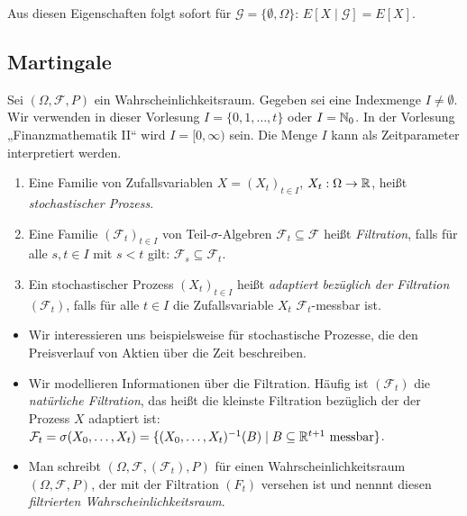 \documentclass[a4paper,twoside,DIV15,BCOR12mm]{scrbook}
\newcommand{\cF}{\mathcal F}
\begin{document}
Aus diesen Eigenschaften folgt sofort für $\mathcal G = \{\emptyset, \Omega\}$: $E[X\mid\mathcal G] = E[X]$.


\subsection{Martingale}

Sei $(\Omega, \cF, P)$ ein Wahrscheinlichkeitsraum. Gegeben sei eine Indexmenge $I\ne \emptyset$. Wir verwenden in dieser Vorlesung $I=\{0, 1,\ldots,t\}$ oder $I=\mathbb{N}_0$. In der Vorlesung „Finanzmathematik II“ wird $I=[0,\infty)$ sein. Die Menge $I$ kann als Zeitparameter interpretiert werden.

\begin{definition}
\begin{enumerate}
\item Eine Familie von Zufallsvariablen $X=(X_t)_{t\in I}$, $X_t:\Omega \to \mathbb{R}$, heißt \emph{stochastischer Prozess}.
\item Eine Familie $(\cF_t)_{t\in I}$ von Teil-$\sigma$-Algebren $\cF_t \subseteq \cF$ heißt \emph{Filtration}, falls für alle $s,t\in I$ mit $s<t$ gilt: $\cF_s \subseteq \cF_t$.
\item Ein stochastischer Prozess $(X_t)_{t\in I}$ heißt \emph{adaptiert bezüglich der Filtration $(\cF_t)$},  falls für alle $t\in I$ die Zufallsvariable $X_t$ $\cF_t$-messbar ist.
\end{enumerate}
\end{definition}

\begin{bemerkung}
\begin{itemize}
\item Wir interessieren uns beispielsweise für stochastische Prozesse, die den Preisverlauf von Aktien über die Zeit beschreiben.
\item Wir modellieren Informationen über die Filtration. Häufig ist $(\cF_t)$ die \emph{natürliche Filtration}, das heißt die kleinste Filtration bezüglich der der Prozess $X$ adaptiert ist: $\cF_t = \sigma(X_0,\ldots,X_t) = \{(X_0,\ldots,X_t)^{-1}(B)\mid B\subseteq \MdR^{t+1} \text{ messbar}\}$.
\item Man schreibt $(\Omega, \cF, (\cF_t), P)$ für einen Wahrscheinlichkeitsraum $(\Omega, \cF, P)$, der mit der Filtration $(F_t)$ versehen ist und nennnt diesen \emph{filtrierten Wahrscheinlichkeitsraum}.
\end{itemize}
\end{bemerkung}
\end{document}
